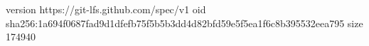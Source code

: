 version https://git-lfs.github.com/spec/v1
oid sha256:1a694f0687fad9d1dfefb75f5b5b3dd4d82bfd59e5f5ea1f6c8b395532eea795
size 174940
